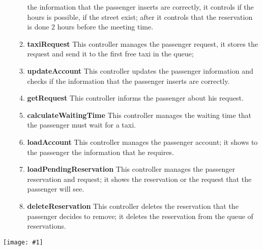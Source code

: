 \documentclass[11pt, a4paper,titlepage]{article}
\newcommand{\image}[1]{
	\begin{center}
		\noindent \texttt{[image: \#1]}
	\end{center}
	}
\begin{document}
\begin{enumerate}
\begin{enumerate}
		the information that the passenger inserts are correctly, it controls if the hours is possible, if the street exist; after it controls that the reservation is done 2 hours before the meeting time.
		\item \textbf{taxiRequest} This controller manages the passenger request, it stores the request 
		and send it to the first free taxi in the queue;
		\item \textbf{updateAccount} This controller updates the passenger information and checks if 
		the information that the passenger inserts are correctly.
		\item \textbf{getRequest} This controller informs the passenger about his request.
		\item \textbf{calculateWaitingTime} This controller manages the waiting time that the passenger 
		must wait for a taxi.
		\item \textbf{loadAccount} This controller manages the passenger account; it shows to the 
		passenger the information that he requires.
		\item \textbf{loadPendingReservation} This controller manages the passenger reservation and 
		request; it shows the reservation or the request that the passenger will see.
		\item \textbf{deleteReservation} This controller deletes the reservation that the passenger 
		decides to remove; it deletes the reservation from the queue of reservations.
	\end{enumerate}
\end{enumerate}
\image{BCEPassenger.png}
\newpage
\end{document}
